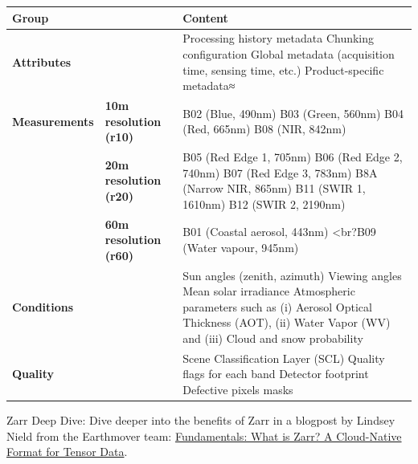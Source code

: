 \documentclass[
  letterpaper,
  DIV=11,
  numbers=noendperiod]{scrreprt}
\begin{document}
\begin{longtable}[]{@{}
  >{\raggedright\arraybackslash}p{}
  >{\raggedright\arraybackslash}p{}
  >{\raggedright\arraybackslash}p{}@{}}
\toprule\noalign{}
\begin{minipage}[b]{\linewidth}\raggedright
Group
\end{minipage} & \begin{minipage}[b]{\linewidth}\raggedright
\end{minipage} & \begin{minipage}[b]{\linewidth}\raggedright
Content
\end{minipage} \\
\midrule\noalign{}
\endhead
\bottomrule\noalign{}
\endlastfoot
\textbf{Attributes} & & Processing history metadata Chunking
configuration Global metadata (acquisition time, sensing time, etc.)
Product-specific metadata≈ \\
\textbf{Measurements} & \textbf{10m resolution (r10)} & B02 (Blue,
490nm) B03 (Green, 560nm) B04 (Red, 665nm) B08 (NIR, 842nm) \\
& \textbf{20m resolution (r20)} & B05 (Red Edge 1, 705nm) B06 (Red Edge
2, 740nm) B07 (Red Edge 3, 783nm) B8A (Narrow NIR, 865nm) B11 (SWIR 1,
1610nm) B12 (SWIR 2, 2190nm) \\
& \textbf{60m resolution (r60)} & B01 (Coastal aerosol, 443nm)
\textless br?B09 (Water vapour, 945nm) \\
\textbf{Conditions} & & Sun angles (zenith, azimuth) Viewing angles Mean
solar irradiance Atmospheric parameters such as (i) Aerosol Optical
Thickness (AOT), (ii) Water Vapor (WV) and (iii) Cloud and snow
probability \\
\textbf{Quality} & & Scene Classification Layer (SCL) Quality flags for
each band Detector footprint Defective pixels masks \\
\end{longtable}

\begin{tcolorbox}[enhanced jigsaw, coltitle=black, colback=white, leftrule=.75mm, colbacktitle=quarto-callout-note-color!10!white, titlerule=0mm, title=\textcolor{quarto-callout-note-color}{\faInfo}\hspace{0.5em}{Note}, rightrule=.15mm, bottomrule=.15mm, bottomtitle=1mm, toptitle=1mm, arc=.35mm, toprule=.15mm, left=2mm, opacityback=0, colframe=quarto-callout-note-color-frame, opacitybacktitle=0.6, breakable]

Zarr Deep Dive: Dive deeper into the benefits of Zarr in a blogpost by
Lindsey Nield from the Earthmover team:
\href{https://earthmover.io/blog/what-is-zarr}{Fundamentals: What is
Zarr? A Cloud-Native Format for Tensor Data}.

\end{tcolorbox}
\end{document}
